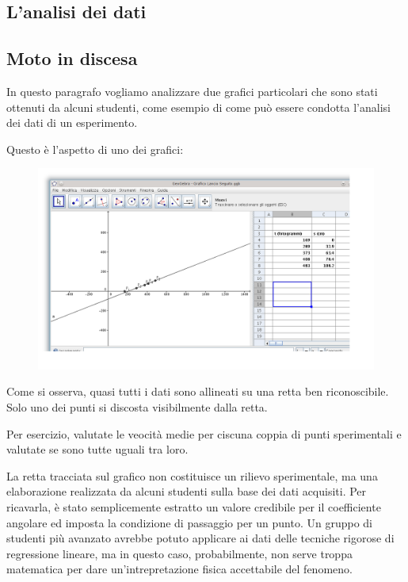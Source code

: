\subsection*{L'analisi dei dati}
\subsection{Moto in discesa}
In questo paragrafo vogliamo analizzare due grafici particolari che sono stati ottenuti da alcuni studenti, come esempio di come può essere condotta l'analisi dei dati di un esperimento.

 Questo è l'aspetto di uno dei grafici:

\begin{figure}[H]
 \centering
 \includegraphics[width=.7\textwidth]{../immagini/discesa.png}
 \label{fig:moto di discesa}
\end{figure}

Come si osserva, quasi tutti i dati sono allineati su una retta ben riconoscibile.\newline
Solo uno dei punti si discosta visibilmente dalla retta.\newline

Per esercizio, valutate le veocità medie per ciscuna coppia di punti sperimentali e valutate se sono tutte uguali tra loro.\newline

La retta tracciata sul grafico non costituisce un rilievo sperimentale, ma una elaborazione realizzata da alcuni studenti sulla base dei dati acquisiti. Per ricavarla, è stato semplicemente estratto un valore credibile per il coefficiente angolare ed imposta la condizione di passaggio per un punto. Un gruppo di studenti più avanzato avrebbe potuto applicare ai dati delle tecniche rigorose di regressione lineare, ma in questo caso, probabilmente, non serve troppa matematica per dare un'intrepretazione fisica accettabile del fenomeno.\newline

